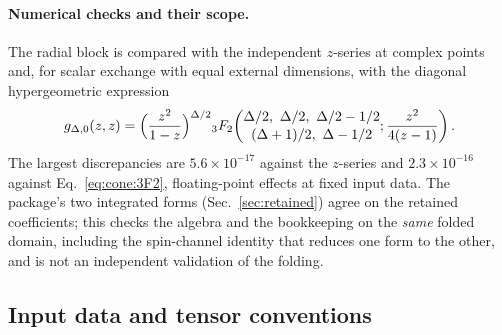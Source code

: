 \documentclass[11pt,a4paper]{article}
\numberwithin{equation}{section}
\newcommand{\sci}[2]{#1\times10^{#2}}
\begin{document}
\paragraph{Numerical checks and their scope.} The radial block is compared with the independent $z$-series at complex
points and, for scalar exchange with equal external dimensions, with the diagonal hypergeometric expression
\begin{equation}
 g_{\Delta,0}(z,z)=\Bigl(\frac{z^2}{1-z}\Bigr)^{\Delta/2}
 {}_3F_2\!\left(\begin{matrix}\Delta/2,\ \Delta/2,\ \Delta/2-1/2\\[1pt](\Delta+1)/2,\ \Delta-1/2\end{matrix};
 \frac{z^2}{4(z-1)}\right).
 \label{eq:cone:3F2}
\end{equation}
The largest discrepancies are $\sci{5.6}{-17}$ against the $z$-series and $\sci{2.3}{-16}$ against
Eq.~\eqref{eq:cone:3F2}, floating-point effects at fixed input data. The
package's two integrated forms (Sec.~\ref{sec:retained}) agree on the retained coefficients; this checks the algebra
and the bookkeeping on the \emph{same} folded domain, including the spin-channel identity that reduces one form to the
other, and is not an independent validation of the folding.

\subsection{Input data and tensor conventions}\label{app:cone:inputs}
\end{document}
